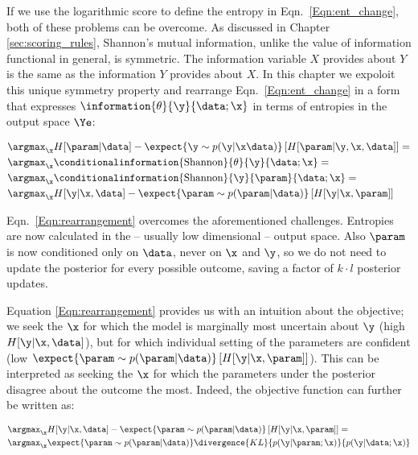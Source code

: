 If we use the logarithmic score to define the entropy in Eqn.\ \eqref{Eqn:ent_change}, both of these problems can be overcome. As discussed in Chapter \ref{sec:scoring_rules}, Shannon's mutual information, unlike the value of information functional in general, is symmetric. The information variable $X$ provides about $Y$ is the same as the information $Y$ provides about $X$. In this chapter we expoloit this unique symmetry property and rearrange Eqn.\ \eqref{Eqn:ent_change} in a form that expresses $\information{\theta}{\y}{\data;\x}$ in terms of entropies in the output space $\Ye$:

\begin{align}
	&\argmax_{\x} H[\param | \data] - \expect{\y\sim p(\y|\x\data)} \left[ H[\param| \y, \x,\data] \right] =\\
	&\argmax_{\x} \conditionalinformation{\mbox{Shannon}}{\theta}{\y}{\data;\x} =\\
	&\argmax_{\x} \conditionalinformation{\mbox{Shannon}}{\y}{\param}{\data;\x} =\\
	&\argmax_{\x} H[\y \vert \x, \data] - \expect{\param\sim p(\param|\data)} \left[ H[\y \vert \x,\param] \right] \label{Eqn:rearrangement} 
\end{align}

Eqn.\ \eqref{Eqn:rearrangement} overcomes the aforementioned challenges. Entropies are now calculated in the -- usually low dimensional -- output space. Also $\param$ is now conditioned only on $\data$, never on $\x$ and $\y$, so we do not need to update the posterior for every possible outcome, saving a factor of $k\cdot l$ posterior updates.

Equation \eqref{Eqn:rearrangement} provides us with an intuition about the objective; we seek the $\x$ for which the model is marginally most uncertain about $\y$ (high $H[\y \vert \x, \data]$), but for which individual setting of the parameters are confident (low $\expect{\param\sim p(\param|\data)} \left[ H[\y \vert \x,\param] \right]$). This can be interpreted as seeking the $\x$ for which the parameters under the posterior disagree about the outcome the most. Indeed, the objective function can further be written as:

\begin{align}
	&\argmax_{\x} H[\y \vert \x, \data] - \expect{\param\sim p(\param|\data)} \left[ H[\y \vert \x,\param] \right] = \\
	&\argmax_{\x} \expect{\param\sim p(\param|\data)}  \divergence{KL}{p(\y\vert\param;\x)}{p(\y\vert\data;\x)}
\end{align}

